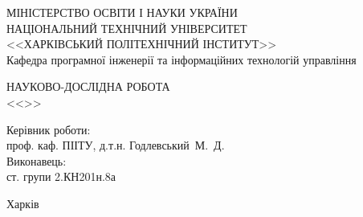\begin{titlepage}
	\vspace*{\fill} %
	
	\begin{framed}
		\begin{center}
			МІНІСТЕРСТВО ОСВІТИ І НАУКИ УКРАЇНИ \\
			НАЦІОНАЛЬНИЙ ТЕХНІЧНИЙ УНІВЕРСИТЕТ \\
			<<ХАРКІВСЬКИЙ ПОЛІТЕХНІЧНИЙ ІНСТИТУТ>> \\
			Кафедра програмної інженерії та інформаційних технологій управління
		\end{center}
	
		\begin{center}
			\MakeUppercase{Науково-дослідна робота} \\ 
			<<\thetitle>>
		\end{center}
	
		\noindent	
		Керівник роботи: \\
		\hspace*{\parindent} проф. каф. ПІІТУ, д.т.н. \hfill Годлевський~М.~Д. \\
		Виконавець: \\
		\hspace*{\parindent} ст. групи 2.КН201н.8а \hfill \theauthor
	
		\begin{center}
			Харків \the\year
		\end{center}
	\end{framed}

	\vspace*{\fill} %
\end{titlepage}

